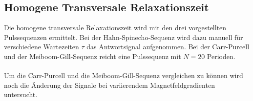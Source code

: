 \subsection{Homogene Transversale Relaxationszeit}
Die homogene transversale Relaxationszeit wird mit den drei vorgestellten Pulssequenzen ermittelt. Bei der Hahn-Spinecho-Sequenz wird dazu manuell für verschiedene Wartezeiten $\tau$ das Antwortsignal aufgenommen. Bei der Carr-Purcell und der Meiboom-Gill-Sequenz reicht eine Pulssequenz mit $N=20$ Perioden.\\ \\
Um die Carr-Purcell und die Meiboom-Gill-Sequenz vergleichen zu können wird noch die Änderung der Signale bei variierendem Magnetfeldgradienten untersucht.
